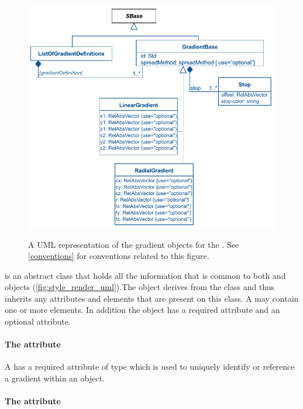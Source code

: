 \begin{figure}[h!]
  \centering
  \includegraphics{images/render-gradient-definitions-uml}\\
  \caption{A UML representation of the gradient objects for the \RenderPackage.  See \ref{conventions} for conventions related to this figure. }
  \label{fig:gradient_render_uml}
\end{figure}


\GradientBase is an abstract class that holds all the information that is common to both \RadialGradient and \LinearGradient objects (\ref{fig:style_render_uml}).The \GradientBase object derives from the \SBase class and thus inherits
any attributes and elements that are present on this class.
A \GradientBase may contain one or more \GradientStop elements.
In addition the \GradientBase object has a required  attribute and an optional  attribute.

\paragraph{The \fixttspace{} attribute}

A \GradientBase has a required attribute  of type
 which is used to uniquely identify or reference a gradient within an \RenderInformation object.

\paragraph{The \fixttspace{} attribute}

